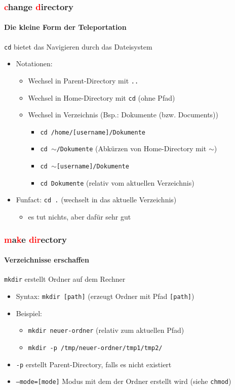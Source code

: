 \documentclass[12pt,utf8]{beamer}
\begin{document}
\begin{frame}
\frametitle{\textcolor{red}{c}hange \textcolor{red}{d}irectory}
\framesubtitle{\textcolor{ownDarkOr}{Die kleine Form der Teleportation}}
\texttt{cd} bietet das Navigieren durch das Dateisystem
\begin{itemize}
	\item Notationen:	
	\begin{itemize}[<+->]
		\item Wechsel in Parent-Directory mit \texttt{..}
		\item Wechsel in Home-Directory mit \texttt{cd}   (ohne Pfad)
		\item Wechsel in Verzeichnis (Bsp.: Dokumente (bzw. Documents))
		\begin{itemize}[<+->]
			\item \texttt{cd /home/[username]/Dokumente}
			\item \texttt{cd $\sim$/Dokumente}   (Abkürzen von Home-Directory mit $\sim$)
			\item \texttt{cd $\sim$[username]/Dokumente}
			\item \texttt{cd Dokumente}    (relativ vom aktuellen Verzeichnis)
		\end{itemize}
	\end{itemize}
	\item Funfact: \texttt{cd .}  (wechselt in das aktuelle Verzeichnis)
	\begin{itemize}
		\item es tut nichts, aber dafür sehr gut
	\end{itemize}
\end{itemize}
\end{frame}

\begin{frame}
\frametitle{\textcolor{red}{m}a\textcolor{red}{k}e \textcolor{red}{dir}ectory}
\framesubtitle{\textcolor{ownDarkOr}{Verzeichnisse erschaffen}}
\texttt{mkdir} erstellt Ordner auf dem Rechner
\begin{itemize}
	\item Syntax: \texttt{mkdir [path]}   (erzeugt Ordner mit Pfad \texttt{[path]})
	\item Beispiel:
	\begin{itemize}[<+->]
		\item \texttt{mkdir neuer-ordner}    (relativ zum aktuellen Pfad)
		\item \texttt{mkdir -p /tmp/neuer-ordner/tmp1/tmp2/}
	\end{itemize}
	\item \texttt{-p}   erstellt Parent-Directory, falls es nicht existiert
	\item \texttt{--mode=[mode]}  Modus mit dem der Ordner erstellt wird (siehe \texttt{chmod})
\end{itemize}
\end{frame}
\end{document}
